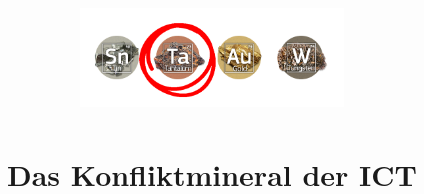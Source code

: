 \documentclass[a4paper,11pt]{article}
\title{
  \includegraphics[width=7cm]{images/banner-minerals}\\[\bigskipamount]
  \documenttitle\\[\bigskipamount]
  \large Das Konfliktmineral der ICT
}
\author{\documentauthors}
\date{\parbox{\linewidth}{\centering%
  Datum \documentdate\endgraf
}}
\begin{document}
\maketitle\thispagestyle{empty}\newpage

\begin{abstract}
  
          \newpage
\end{abstract}









\end{document}
